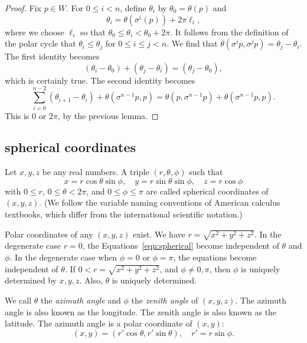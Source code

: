 \begin{proof}
Fix $p\in W$.
For $0\le i<n$, define $\theta_i$ by
   $\theta_0=\theta(p)$ and 
   $$\theta_i = \theta(\sigma^i(p)) + 2\pi \ell_i,$$
where we choose $\ell_i$ so that $\theta_0\le \theta_i < \theta_0+2\pi$.
It follows from the definition of the polar cycle that
$\theta_i \le \theta_j$ for $0\le i\le j < n$. We find that
$\theta(\sigma^i p ,\sigma^j p) = \theta_j - \theta_i$.
The first identity becomes
  $$
  (\theta_i-\theta_0) + (\theta_j-\theta_i) = (\theta_j-\theta_0),
  $$
which is certainly true.
The second identity becomes
  $$
  \sum_{i=0}^{n-2} (\theta_{i+1}-\theta_i) + \theta(\sigma^{n-1}p,p)
  = \theta(p,\sigma^{n-1}p) + \theta(\sigma^{n-1}p,p).
  $$
This is $0$ or $2\pi$, by the previous lemma.
\end{proof}

\subsection{spherical coordinates}
\label{sec:spherical}



\begin{definition}
Let $x,y,z$ be any real numbers.  A
triple $(r,\theta,\phi)$ such that
    \begin{equation}
    \label{eqn:spherical}
    x = r\cos\theta\sin\phi,\quad y = r\sin\theta\sin\phi,\quad
    z = r\cos\phi
    \end{equation}
with $0\le r$, $0\le\theta<2\pi$, and $0\le\phi\le\pi$ are called
spherical coordinates of $(x,y,z)$.  (We follow the variable
naming conventions of American calculus textbooks, which differ
from the international scientific notation.)
\end{definition}

Polar coordinates of any $(x,y,z)$ exist.
We have $r = \sqrt{x^2+y^2+z^2}$.  In the degenerate case $r=0$,
the Equations~\ref{eqn:spherical} become independent of $\theta$
and $\phi$. In the degenerate case when $\phi = 0$ or $\phi =
\pi$, the equations become independent of $\theta$. If $0<r =
\sqrt{x^2+y^2+z^2}$, and $\phi\ne 0,\pi$,  then $\phi$ is uniquely
determined by $x,y,z$. Also, $\theta$ is uniquely determined.


We call $\theta$ the {\it azimuth angle\/} and $\phi$ the {\it
zenith angle\/} of $(x,y,z)$.  The azimuth angle is also known as
the longitude.  The zenith angle is also known as the latitude. The
azimuth angle is a polar coordinate of $(x,y)$:
    $$
    (x,y) = (r'\cos\theta,r'\sin\theta), \quad r' = r\sin\phi.
    $$


